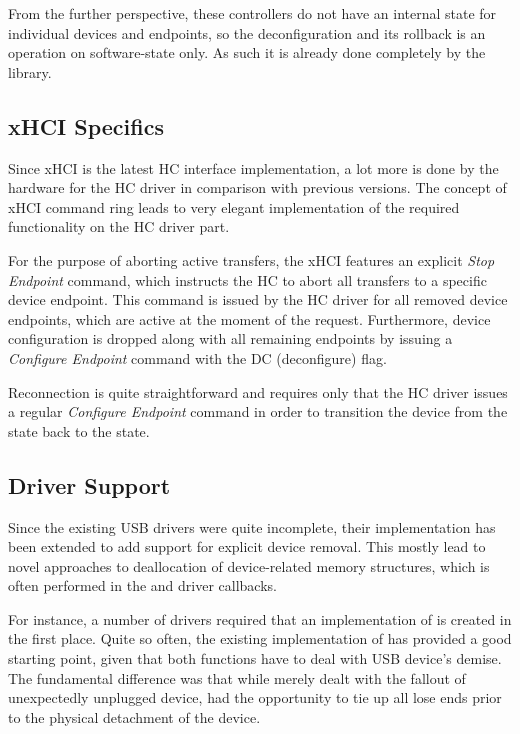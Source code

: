 From the further perspective, these controllers do not have an internal state
for individual devices and endpoints, so the deconfiguration and its rollback
is an operation on software-state only. As such it is already done completely
by the  library.

\subsection{xHCI Specifics}

Since xHCI is the latest HC interface implementation, a lot more is done by the
hardware for the HC driver in comparison with previous versions. The concept of
xHCI command ring leads to very elegant implementation of the required
functionality on the HC driver part.

For the purpose of aborting active transfers, the xHCI features an explicit
\textit{Stop Endpoint} command, which instructs the HC to abort all transfers
to a specific device endpoint. This command is issued by the HC driver for all
removed device endpoints, which are active at the moment of the request.
Furthermore, device configuration is dropped along with all remaining endpoints
by issuing a \textit{Configure Endpoint} command with the DC (deconfigure)
flag.

Reconnection is quite straightforward and requires only that the HC driver
issues a regular \textit{Configure Endpoint} command in order to transition the
device from the  state back to the  state.


\subsection{Driver Support}

Since the existing USB drivers were quite incomplete, their implementation has
been extended to add support for explicit device removal. This mostly lead to
novel approaches to deallocation of device-related memory structures, which is
often performed in the  and  driver
callbacks.

For instance, a number of drivers required that an implementation of
 is created in the first place. Quite so often, the
existing implementation of  has provided a good starting
point, given that both functions have to deal with USB device's demise. The
fundamental difference was that while  merely dealt with
the fallout of unexpectedly unplugged device,  had the
opportunity to tie up all lose ends prior to the physical detachment of the
device.

